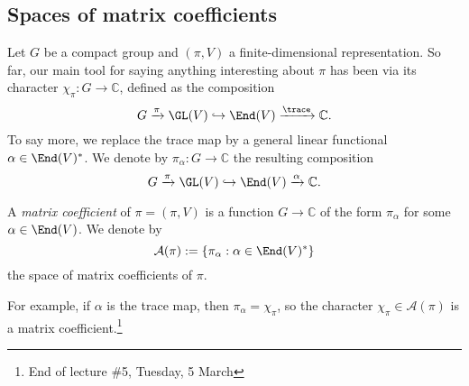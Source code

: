 \documentclass[reqno]{amsart} 
\begin{document}
\subsection{Spaces of matrix coefficients}
Let $G$ be a compact group and $(\pi,V)$ a finite-dimensional representation.  So far, our main tool for saying anything interesting about $\pi$ has been via its character $\chi_\pi : G \rightarrow \mathbb{C}$, defined as the composition
\begin{equation}\label{eq:}
  G \xrightarrow{\pi } \GL(V) \hookrightarrow \End(V)
  \xrightarrow{\trace} \mathbb{C}.
\end{equation}
To say more, we replace the trace map by a general linear functional $\alpha \in \End(V)^*$.  We denote by $\pi_\alpha : G \rightarrow \mathbb{C}$ the resulting composition
\begin{equation}\label{eq:}
  G \xrightarrow{\pi } \GL(V)
  \hookrightarrow \End(V)
  \xrightarrow{\alpha } \mathbb{C}.
\end{equation}
\begin{definition}
  A \emph{matrix coefficient} of $\pi = (\pi,V)$ is a function $G \rightarrow \mathbb{C}$ of the form $\pi_\alpha$ for some $\alpha \in \End(V)$.  We denote by
  \begin{equation}\label{eq:}
    \mathcal{A}(\pi) := \{\pi_\alpha : \alpha \in \End(V)^*\}
  \end{equation}
  the space of matrix coefficients of $\pi$.
\end{definition}
For example, if $\alpha$ is the trace map, then $\pi_\alpha = \chi_\pi$, so the character $\chi_\pi \in \mathcal{A}(\pi)$ is a matrix coefficient.\footnote{End of lecture \#5, Tuesday, 5 March}
\end{document}
